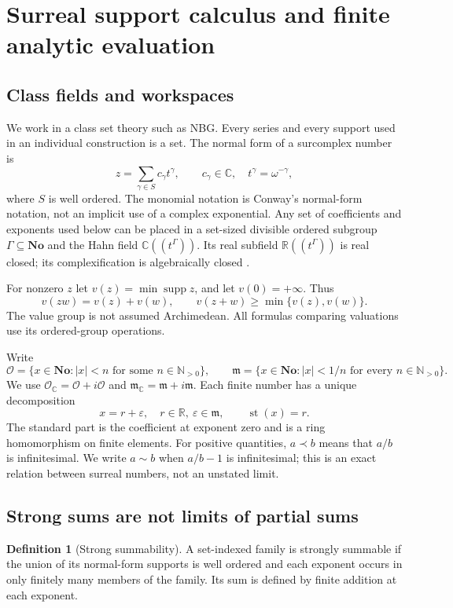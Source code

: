 \documentclass[11pt,letterpaper]{article}
\theoremstyle{definition}
\newtheorem{definition}[theorem]{Definition}
\theoremstyle{remark}
\newcommand{\No}{\mathbf{No}}
\newcommand{\R}{\mathbb R}\newcommand{\C}{\mathbb C}
\newcommand{\N}{\mathbb N}\newcommand{\Z}{\mathbb Z}
\newcommand{\OO}{\mathcal O}\newcommand{\mm}{\mathfrak m}
\newcommand{\st}{\operatorname{st}}
\newcommand{\supp}{\operatorname{supp}}
\numberwithin{equation}{section}
\begin{document}
\section{Surreal support calculus and finite analytic evaluation}\label{sec:foundations}
\subsection{Class fields and workspaces}
We work in a class set theory such as NBG. Every series and every support used in an individual construction is a set. The normal form of a surcomplex number is
\begin{equation}\label{eq:normal}
 z=\sum_{\gamma\in S}c_\gamma t^\gamma,
 \qquad c_\gamma\in\C,\quad t^\gamma=\omega^{-\gamma},
\end{equation}
where $S$ is well ordered. The monomial notation is Conway's normal-form notation, not an implicit use of a complex exponential. Any set of coefficients and exponents used below can be placed in a set-sized divisible ordered subgroup $\Gamma\subseteq\No$ and the Hahn field $\C((t^\Gamma))$. Its real subfield $\R((t^\Gamma))$ is real closed; its complexification is algebraically closed \cite{vdDE,Poonen}.

For nonzero $z$ let $v(z)=\min\supp z$, and let $v(0)=+\infty$. Thus
\[
 v(zw)=v(z)+v(w),\qquad v(z+w)\ge\min\{v(z),v(w)\}.
\]
The value group is not assumed Archimedean. All formulas comparing valuations use its ordered-group operations.

Write
\[
 \OO=\{x\in\No:|x|<n\text{ for some }n\in\N_{>0}\},
 \qquad
 \mm=\{x\in\No:|x|<1/n\text{ for every }n\in\N_{>0}\}.
\]
We use $\OO_\C=\OO+i\OO$ and $\mm_\C=\mm+i\mm$. Each finite number has a unique decomposition
\[
 x=r+\varepsilon,\quad r\in\R,\ \varepsilon\in\mm,
 \qquad \st(x)=r.
\]
The standard part is the coefficient at exponent zero and is a ring homomorphism on finite elements. For positive quantities, $a\prec b$ means that $a/b$ is infinitesimal. We write $a\sim b$ when $a/b-1$ is infinitesimal; this is an exact relation between surreal numbers, not an unstated limit.

\subsection{Strong sums are not limits of partial sums}
\begin{definition}[Strong summability]
A set-indexed family is strongly summable if the union of its normal-form supports is well ordered and each exponent occurs in only finitely many members of the family. Its sum is defined by finite addition at each exponent.
\end{definition}
\end{document}
